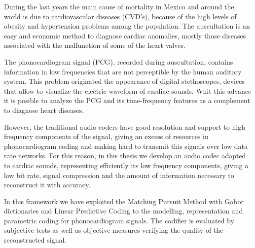 During the last years the main cause of mortality in Mexico and around the world is due to cardiovascular diseases (CVD's), because of the high levels of obesity and hypertension problems among the population. The auscultation is an easy and economic method to diagnose cardiac anomalies, mostly those diseases associated with the malfunction of some of the heart valves. 

The phonocardiogram signal (PCG), recorded during auscultation, contains information in low frequencies that are not perceptible by the human auditory system. This problem originated the appearance of digital stethoscopes, devices that allow to visualize the electric waveform of cardiac sounds. Whit this advance it is posible to analyze the PCG and its time-frequency features as a complement to diagnose heart diseases. 

However, the traditional audio coders have good resolution and support to high frequency components of the signal, giving an excess of resources in phonocardiogram coding and making hard to transmit this signals over low data rate networks. For this reason, in this thesis we develop an audio codec adapted to cardiac sounds, representing efficiently its low frequency components, giving a low bit rate, signal compression and the amount of information necessary to reconstruct it with accuracy. 

In this framework we have exploited the Matching Pursuit Method with Gabor dictionaries and Linear Predictive Coding to the modelling, representation and parametric coding for phonocardiogram signals. The codifier is evaluated by subjective tests as well as objective measures verifying the quality of the reconstructed signal.





